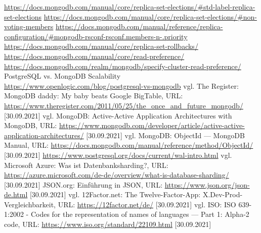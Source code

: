 \begin{thebibliography}{HR08}
          \url{https://docs.mongodb.com/manual/core/replica-set-elections/#std-label-replica-set-elections}
          \url{https://docs.mongodb.com/manual/core/replica-set-elections/#non-voting-members}
          \url{https://docs.mongodb.com/manual/reference/replica-configuration/#mongodb-rsconf-rsconf.members-n-.priority}
          \url{https://docs.mongodb.com/manual/core/replica-set-rollbacks/}
          \url{https://docs.mongodb.com/manual/core/read-preference/}
          \url{https://docs.mongodb.com/realm/mongodb/specify-cluster-read-preference/}
          PostgreSQL vs. MongoDB Scalability \url{https://www.openlogic.com/blog/postgresql-vs-mongodb}
          vgl. The Register: MongoDB daddy: My baby beats Google BigTable, URL: \url{https://www.theregister.com/2011/05/25/the_once_and_future_mongodb/} [30.09.2021]
          vgl. MongoDB: Active-Active Application Architectures with MongoDB, URL: \url{https://www.mongodb.com/developer/article/active-active-application-architectures/} [30.09.2021]
          vgl. MongoDB: ObjectId — MongoDB Manual, URL: \url{https://docs.mongodb.com/manual/reference/method/ObjectId/} [30.09.2021]
          \url{https://www.postgresql.org/docs/current/wal-intro.html}
          vgl. Microsoft Azure: Was ist Datenbanksharding?, URL: \url{https://azure.microsoft.com/de-de/overview/what-is-database-sharding/} [30.09.2021]
          JSON.org: Einführung in JSON, URL: \url{https://www.json.org/json-de.html} [30.09.2021]
          vgl. 12Factor.net: The Twelve-Factor-App: X.Dev-Prod-Vergleichbarkeit, URL: \url{https://12factor.net/de/} [30.09.2021]
          vgl. ISO: ISO 639-1:2002 - Codes for the representation of names of languages — Part 1: Alpha-2 code, URL: \url{https://www.iso.org/standard/22109.html} [30.09.2021]
     \end{thebibliography}